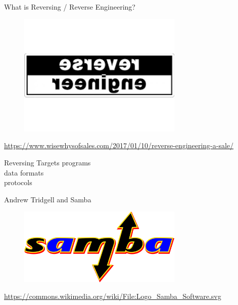\documentclass{simple}
\begin{document}
\begin{frame}{What is Reversing / Reverse Engineering?}
  \begin{figure}
    \centering
    \includegraphics[width=0.7\textwidth]{img/reverse-engineering}
  \end{figure}
  \begin{center}
    \tiny
    \url{https://www.wisewhysofsales.com/2017/01/10/reverse-engineering-a-sale/}
  \end{center}
\end{frame}

\begin{frame}{Reversing Targets}
  \centering
  \pause \Large{programs} \\
  \vspace{0.5cm}
  \pause \Large{data formats} \\
  \vspace{0.5cm}
  \pause \Large{protocols}
\end{frame}

\begin{frame}{Andrew Tridgell and Samba}
  \begin{figure}
    \centering
    \includegraphics[width=0.7\textwidth]{img/samba}
  \end{figure}
  \begin{center}
    \tiny
    \url{https://commons.wikimedia.org/wiki/File:Logo_Samba_Software.svg}
  \end{center}
\end{frame}
\end{document}
